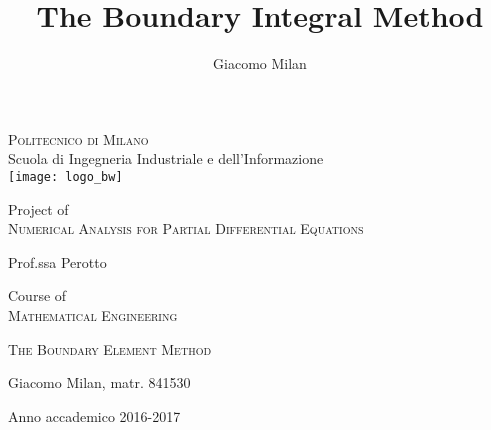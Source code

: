 \documentclass[10pt, a4paper]{article} %
\title{The Boundary Integral Method}
\author{Giacomo Milan}
\numberwithin{equation}{section}
\theoremstyle{definition}
\theoremstyle{plain}
\theoremstyle{plain}
\theoremstyle{plain}
\theoremstyle{plain}
\theoremstyle{plain}
\theoremstyle{plain}
\theoremstyle{plain}
\theoremstyle{plain}
\begin{document}
\begin{titlepage}
    \begin{center}
        \Large
        \vspace*{1cm}
        \textsc{Politecnico di Milano}\\
        Scuola di Ingegneria Industriale e dell'Informazione\\
        \vspace{1cm}
        \texttt{[image: logo\_bw]}
        
        \normalsize
        \vspace{1cm}
        Project of \\
        \large
        \textsc{Numerical Analysis for Partial Differential Equations}\\
        \begin{flushright}
        \normalsize
         Prof.ssa Perotto
        \end{flushright}
        \normalsize
        Course of \\
        \large
        \textsc{Mathematical Engineering}
        

        \vspace{0.8cm}
        \huge
        \textsc{The Boundary Element Method}
        
        
        \vspace{1.5cm}
        \begin{flushright}
        \normalsize
        {Giacomo Milan, matr. 841530}         
        \end{flushright}
        \normalsize
        \vfill
        Anno accademico 2016-2017
        
    \end{center}
\end{titlepage}
\newpage
\thispagestyle{empty}
\mbox{}
\newpage
\tableofcontents
\clearpage
\end{document}
